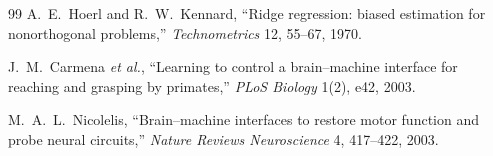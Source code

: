 \documentclass[10pt,a4paper]{article}
\begin{document}
\begin{thebibliography}{99}
A.~E.~Hoerl and R.~W.~Kennard, ``Ridge regression: biased
estimation for nonorthogonal problems,'' \emph{Technometrics} 12,
55--67, 1970.

J.~M.~Carmena \emph{et al.}, ``Learning to control a brain--machine
interface for reaching and grasping by primates,''
\emph{PLoS Biology} 1(2), e42, 2003.

M.~A.~L.~Nicolelis, ``Brain--machine interfaces to restore motor
function and probe neural circuits,'' \emph{Nature Reviews
Neuroscience} 4, 417--422, 2003.

\end{thebibliography}
\end{document}
